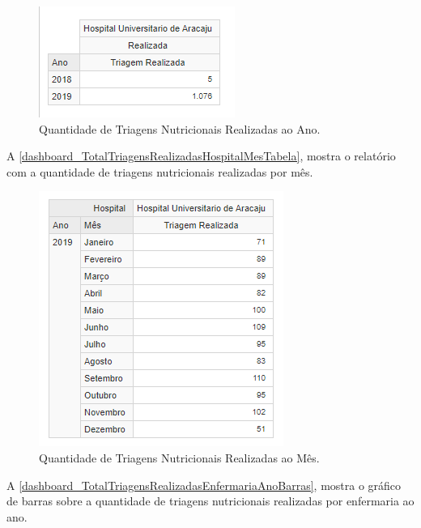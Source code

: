 \begin{figure}[htb]
	\caption{\label{dashboard_TotalTriagensRealizadasHospitalAnoTabela}Quantidade de Triagens Nutricionais Realizadas ao Ano.}
	\begin{center}
	    \includegraphics[scale=1]{Imagens/1.1.TotalTriagensRealizadasHospitalAnoTabela.png}
	\end{center}
\end{figure}
\newpage
A \autoref{dashboard_TotalTriagensRealizadasHospitalMesTabela}, mostra o relatório com a quantidade de triagens nutricionais realizadas por mês. 

\begin{figure}[htb]
	\caption{\label{dashboard_TotalTriagensRealizadasHospitalMesTabela}Quantidade de Triagens Nutricionais Realizadas ao Mês.}
	\begin{center}
	    \includegraphics[scale=1]{Imagens/1.2.TotalTriagensRealizadasHospitalMesTabela.png}
	\end{center}
\end{figure}

\clearpage
A \autoref{dashboard_TotalTriagensRealizadasEnfermariaAnoBarras}, mostra o gráfico de barras sobre a quantidade de triagens nutricionais realizadas por enfermaria ao ano.


